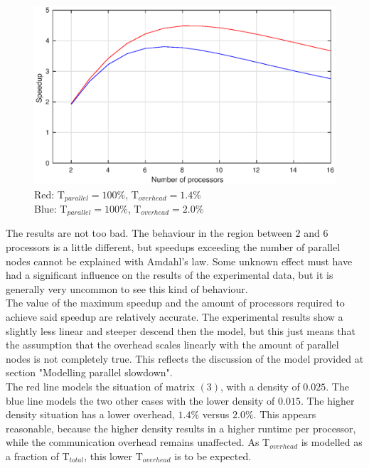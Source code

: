 \begin{figure}[h!]
    \includegraphics[width=0.7\linewidth]{figures/Amd_ver.eps}
    \centering
    \caption{Red: $\text{T}_{parallel} = 100 \%$, $\text{T}_{overhead} = 1.4 \%$\\
    Blue: $\text{T}_{parallel} = 100 \%$, $\text{T}_{overhead} = 2.0 \%$}
    \label{com. amd. ver.}
\end{figure}

The results are not too bad. The behaviour in the region between $2$ and $6$ processors is a little different, but speedups exceeding the number of parallel nodes cannot be explained with Amdahl's law. Some unknown effect must have had a significant influence on the results of the experimental data, but it is generally very uncommon to see this kind of behaviour.\\

The value of the maximum speedup and the amount of processors required to achieve said speedup are relatively accurate. The experimental results show a slightly less linear and steeper descend then the model, but this just means that the assumption that the overhead scales linearly with the amount of parallel nodes is not completely true. This reflects the discussion of the model provided at section "Modelling parallel slowdown".\\

The red line models the situation of matrix $(3)$, with a density of $0.025$. The blue line models the two other cases with the lower density of $0.015$. The higher density situation has a lower overhead, $1.4 \%$ versus $2.0 \%$. This appears reasonable, because the higher density results in a higher runtime per processor, while the communication overhead remains unaffected. As $\text{T}_{overhead}$ is modelled as a fraction of $\text{T}_{total}$, this lower $\text{T}_{overhead}$ is to be expected.